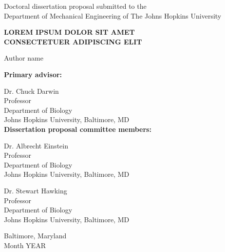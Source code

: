 \documentclass[12pt]{article}
\numberwithin{equation}{section}        %
\begin{document}

\vspace*{0.025in}
\thispagestyle{empty}

\begin{center}
    Doctoral dissertation proposal submitted to the \\
    Department of Mechanical Engineering of The Johns Hopkins University \\
    
    \vspace{0.65in}

    \MakeUppercase{\textbf{LOREM IPSUM DOLOR SIT AMET\\CONSECTETUER ADIPISCING ELIT}}       %
    
    \vspace{0.25in}
    
    Author name   %
\end{center}


\vspace{0.75in}
\begin{singlespace}

    \textbf{Primary advisor:}
    
    Dr. Chuck Darwin \\
    Professor \\
    Department of Biology \\
    Johns Hopkins University, Baltimore, MD \\

    \textbf{Dissertation proposal committee members:} 
    
    Dr. Albrecht Einstein \\
    Professor\\
    Department of Biology \\
    Johns Hopkins University, Baltimore, MD
    
    Dr. Stewart Hawking \\
    Professor\\
    Department of Biology \\
    Johns Hopkins University, Baltimore, MD 
    
\end{singlespace}

\vspace{0.75in}
\begin{center}
    Baltimore, Maryland \\  %
    Month YEAR              %
\end{center}
\end{document}
